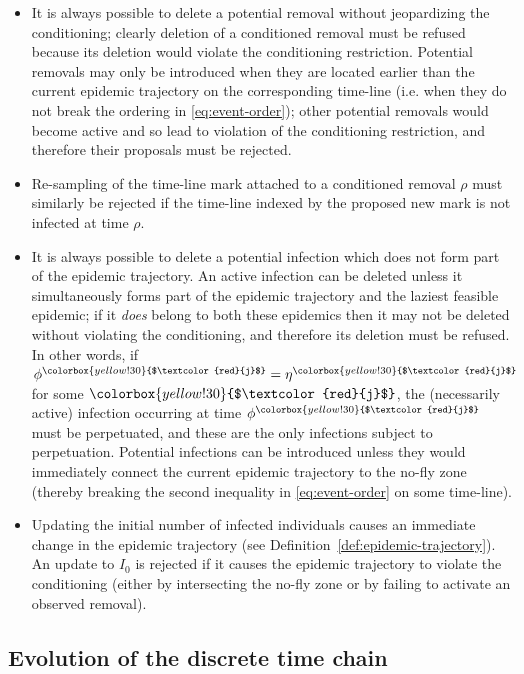 \documentclass[]{article}
\newcommand{\infectee}{{\colorbox{yellow!30}{$\textcolor{red}{j}$}}}
\begin{document}
\begin{itemize}
\item[\ref{item:detailed-removals}:]
It is always possible to delete a potential removal without jeopardizing the conditioning;
clearly deletion of a conditioned removal must be refused because its
deletion would violate the conditioning restriction.
Potential removals may only be introduced when they are located earlier
than the current epidemic trajectory on the corresponding time-line
(i.e. when they do not break the ordering in \eqref{eq:event-order}); 
other potential removals would become active and so lead to violation of the conditioning restriction,
and therefore their proposals must be rejected.
 \item[\ref{item:detailed-re-mark-removals}:]
Re-sampling of the time-line mark attached to a conditioned removal \(\rho\)
must similarly be rejected if the time-line indexed by the proposed new mark is
not infected at time \(\rho\).
 \item[\ref{item:detailed-infections}:]
It is always possible to delete a potential infection which does not form part of the epidemic trajectory. 
An active infection can be deleted unless it simultaneously forms part of the epidemic trajectory 
and the laziest feasible epidemic; 
if it \emph{does} belong to both these epidemics 
then it may not be deleted without violating the conditioning, and therefore its deletion must be refused. 
In other words, if \(\phi^\infectee=\eta^\infectee\) for some \(\infectee\), the (necessarily
active) infection occurring at time \(\phi^\infectee\) must be perpetuated, 
and these are the only infections subject to perpetuation.
Potential infections can be introduced unless they would 
immediately connect the current epidemic trajectory to the no-fly zone 
(thereby breaking the second inequality in \eqref{eq:event-order} on some time-line).
\item[\ref{item:detailed-initial}:] 
Updating the initial number of infected individuals causes an immediate change in the epidemic trajectory (see Definition~\ref{def:epidemic-trajectory}). An update to \(I_0\) is rejected if it causes the epidemic trajectory to violate the conditioning (either by intersecting the no-fly zone or by failing to activate an observed removal).
\end{itemize}

  
\subsection{Evolution of the discrete time chain}\label{ssec:discrete-time-evolution}
  
\end{document}
